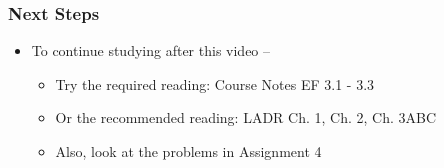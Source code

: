 \documentclass[10pt,english,aspectratio=169]{beamer}
\begin{document}
\begin{frame} \frametitle{Next Steps}

\begin{itemize}
\setlength\itemsep{5mm}
\item To continue studying after this video -- \vspace{2mm}

\begin{itemize}
 \setlength\itemsep{3mm}
 \item Try the required reading: Course Notes EF 3.1 - 3.3
 \item Or the recommended reading: LADR Ch. 1, Ch. 2, Ch. 3ABC
 \item Also, look at the problems in Assignment 4
\end{itemize}
\end{itemize}


\end{frame}
\end{document}
